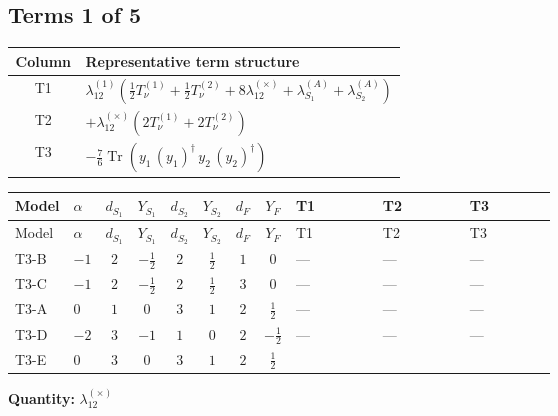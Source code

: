 \documentclass[8pt]{article}
\begin{document}
\begin{landscape}
\subsection*{Terms 1 of 5}
\begin{center}
\begin{tabular}{@{}c >{\raggedright\arraybackslash}p{0.82\linewidth}@{}}
\toprule
Column & Representative term structure \\
\midrule
T1 & \(\displaystyle {\lambda_{12}^{(1)}} \left(\frac{1}{2} T_{\nu}^{(1)}+\frac{1}{2} T_{\nu}^{(2)}+8 {\lambda_{12}^{(\times)}}+{\lambda_{S_1}^{(A)}}+{\lambda_{S_2}^{(A)}}\right)\) \\
\midrule
T2 & \(\displaystyle +{\lambda_{12}^{(\times)}} (2 T_{\nu}^{(1)}+2 T_{\nu}^{(2)})\) \\
\midrule
T3 & \(\displaystyle -\frac{7}{6} \operatorname{Tr}\!\left({y_1}\,\left({y_1}\right)^{\dagger}\,{y_2}\,\left({y_2}\right)^{\dagger}\right)\) \\
\midrule
\bottomrule
\end{tabular}
\end{center}
\smallskip
\tiny
\begin{longtable}{@{}llcccccc >{\raggedright\arraybackslash}p{0.21\linewidth} >{\raggedright\arraybackslash}p{0.21\linewidth} >{\raggedright\arraybackslash}p{0.21\linewidth}@{}}
\toprule
Model & $\alpha$ & $d_{S_1}$ & $Y_{S_1}$ & $d_{S_2}$ & $Y_{S_2}$ & $d_F$ & $Y_F$ & T1 & T2 & T3 \\
\midrule
\endfirsthead
\toprule
Model & $\alpha$ & $d_{S_1}$ & $Y_{S_1}$ & $d_{S_2}$ & $Y_{S_2}$ & $d_F$ & $Y_F$ & T1 & T2 & T3 \\
\midrule
\endhead
T3-B & $-1$ & $2$ & $-\frac{1}{2}$ & $2$ & $\frac{1}{2}$ & $1$ & $0$ & --- & --- & --- \\
\midrule
T3-C & $-1$ & $2$ & $-\frac{1}{2}$ & $2$ & $\frac{1}{2}$ & $3$ & $0$ & --- & --- & --- \\
\midrule
T3-A & $0$ & $1$ & $0$ & $3$ & $1$ & $2$ & $\frac{1}{2}$ & --- & --- & --- \\
\midrule
T3-D & $-2$ & $3$ & $-1$ & $1$ & $0$ & $2$ & $-\frac{1}{2}$ & --- & --- & --- \\
\midrule
T3-E & $0$ & $3$ & $0$ & $3$ & $1$ & $2$ & $\frac{1}{2}$ & \scriptsize\adjustbox{max width=\linewidth}{$\begin{gathered} {\lambda_{12}^{(1)}} \left(\frac{1}{2} T_{\nu}^{(1)}+\frac{1}{2} T_{\nu}^{(2)}+8 {\lambda_{12}^{(\times)}}+{\lambda_{S_1}^{(A)}}+{\lambda_{S_2}^{(A)}}\right)\end{gathered}$} & \scriptsize\adjustbox{max width=\linewidth}{$\begin{gathered} +{\lambda_{12}^{(\times)}} (2 T_{\nu}^{(1)}+2 T_{\nu}^{(2)})\end{gathered}$} & \scriptsize\adjustbox{max width=\linewidth}{$\begin{gathered} -\frac{7}{6} \operatorname{Tr}\!\left({y_1}\,\left({y_1}\right)^{\dagger}\,{y_2}\,\left({y_2}\right)^{\dagger}\right)\end{gathered}$} \\
\midrule
\bottomrule
\end{longtable}
\clearpage
\noindent\textbf{Quantity: }$\lambda_{12}^{(\times)}$\par\smallskip

\end{landscape}
\end{document}
